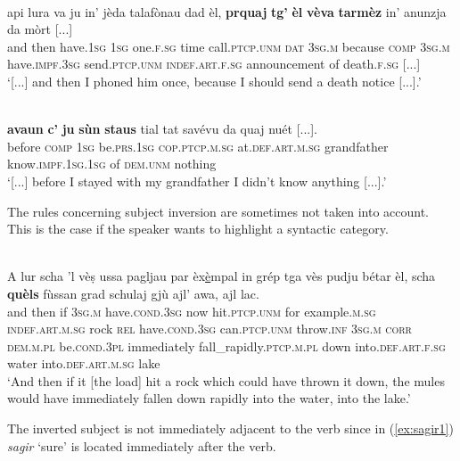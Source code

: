 \ea
\label{}
\\
\gll  [...] api lura va ju in’ jèda talafònau dad èl, \textbf{prquaj} \textbf{tg'} \textbf{èl} \textbf{vèva} \textbf{tarmèz} in’ anunzja da mòrt [...]\\
{} and then have.\textsc{1sg}  \textsc{1sg} one.\textsc{f.sg} time call.\textsc{ptcp.unm} \textsc{dat} \textsc{3sg.m} because \textsc{comp} \textsc{3sg.m} have.\textsc{impf.3sg} send.\textsc{ptcp.unm} \textsc{indef.art.f.sg} announcement of death.\textsc{f.sg} [...]\\ 
\glt `[...] and then I phoned him once, because I should send a death notice [...].'
\z

\ea
\label{}
\\
\gll  [...] \textbf{avaun} \textbf{c’} \textbf{ju} \textbf{sùn} \textbf{staus} tial tat savévu da quaj nuét [...].\\
{} before \textsc{comp} \textsc{1sg} be.\textsc{prs.1sg} \textsc{cop.ptcp.m.sg} at.\textsc{def.art.m.sg} grandfather know.\textsc{impf.1sg.1sg} of \textsc{dem.unm} nothing\\
\glt `[...] before I stayed with my grandfather I didn’t know anything [...].'
\z

The rules concerning subject inversion are sometimes not taken into account. This is the case if the speaker wants to highlight a syntactic category.

\ea
\label{}
\\
\gll   A lur scha ’l vèṣ ussa pagljau par èx\underline{è}mpal in grép tga vès pudju bétar èl, scha \textbf{quèls} fùssan grad schulaj gjù ajl’ awa, ajl lac.\\
and then if \textsc{3sg.m} have.\textsc{cond.3sg} now hit.\textsc{ptcp.unm} for example.\textsc{m.sg} \textsc{indef.art.m.sg} rock \textsc{rel} have.\textsc{cond.3sg} can.\textsc{ptcp.unm} throw.\textsc{inf} \textsc{3sg.m} \textsc{corr} \textsc{dem.m.pl} be.\textsc{cond.3pl} immediately fall\_rapidly.\textsc{ptcp.m.pl} down into.\textsc{def.art.f.sg} water into.\textsc{def.art.m.sg} lake\\
\glt `And then if it [the load] hit a rock which could have thrown it down, the mules would have immediately fallen down rapidly into the water, into the lake.'
\z

The inverted subject is not immediately adjacent to the verb since in (\ref{ex:sagir1}) \textit{sagir} `sure' is located immediately after the verb.

